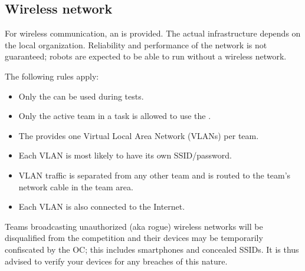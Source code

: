 \subsection{Wireless network}
\label{rule:scenario_wifi}

For wireless communication, an \ArenaNetwork{} is provided.
The actual infrastructure depends on the local organization.
Reliability and performance of the network is not guaranteed; robots are expected to be able to run without a wireless network.

The following rules apply:
\begin{itemize}
	\item Only the \ArenaNetwork{} can be used during tests.
	\item Only the active team in a task is allowed to use the \ArenaNetwork.
	\item The \ArenaNetwork{} provides one Virtual Local Area Network (VLANs) per team.
	\item Each VLAN is most likely to have its own SSID/password.
	\item VLAN traffic is separated from any other team and is routed to the team's network cable in the team area.
	\item Each VLAN is also connected to the Internet.
\end{itemize}

Teams broadcasting unauthorized (aka rogue) wireless networks will be disqualified from the competition and their devices may be temporarily confiscated by the OC; this includes smartphones and concealed SSIDs.
It is thus advised to verify your devices for any breaches of this nature.


